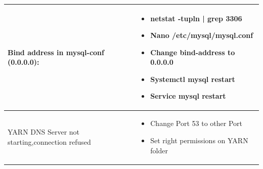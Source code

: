 \documentclass[12pt]{article}
\begin{document}
\begin{table}[H]
\begin{tabular}{|p{4.4cm}|p{12.4cm}|}
Bind address in mysql-conf (0.0.0.0): & \begin{itemize}[noitemsep,leftmargin=*] 
\item netstat -tupln | grep 3306
\item Nano /etc/mysql/mysql.conf
\item Change bind-address to 0.0.0.0
\item Systemctl mysql restart
\item Service mysql restart
\end{itemize}
\\ \hline
YARN DNS Server not starting,\newline connection refused & \begin{itemize}[noitemsep,leftmargin=*] 
\item Change Port 53 to other Port
\item Set right permissions on YARN folder
\end{itemize}
\\ \hline
\end{tabular}
\label{tab:issues}
\end{table}
\end{document}

